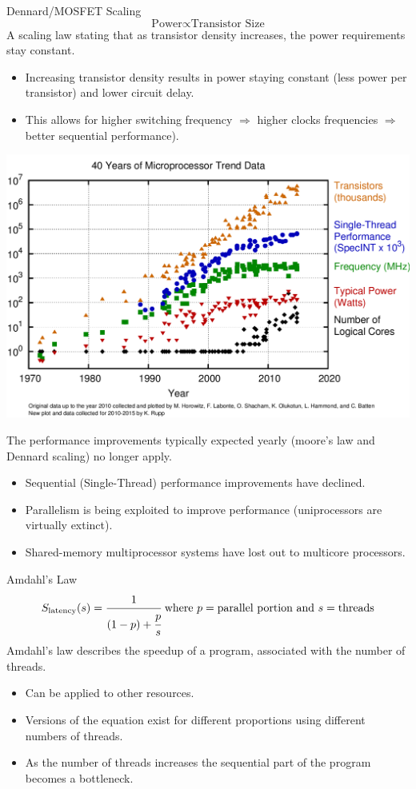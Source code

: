 \begin{definitionbox}{Dennard/MOSFET Scaling}
	\[\text{Power} \propto \text{Transistor Size}\]
	A scaling law stating that as transistor density increases, the power requirements stay constant.
	\begin{itemize}
		\setlength\itemsep{0em}
		\item Increasing transistor density results in power staying constant (less power per transistor) and lower circuit delay.
		\item This allows for higher switching frequency $\Rightarrow$ higher clocks frequencies $\Rightarrow$ better sequential performance).
	\end{itemize}
\end{definitionbox}

\begin{center}
	\includegraphics[width=.9\textwidth]{introduction/images/moores_law_graph.png}
\end{center}
The performance improvements typically expected yearly (moore's law and Dennard scaling) no longer apply.
\begin{itemize}
	\item Sequential (Single-Thread) performance improvements have declined.
	\item Parallelism is being exploited to improve performance (uniprocessors are virtually extinct).
	\item Shared-memory multiprocessor systems have lost out to multicore processors.
\end{itemize}

\begin{definitionbox}{Amdahl's Law}
	\[S_{\text{latency}}(s) = \cfrac{1}{(1-p)+ \cfrac{p}{s}} \text{ where } p = \text{parallel portion} \text{ and } s = \text{threads}\]
	Amdahl's law describes the speedup of a program, associated with the number of threads.
	\begin{itemize}
		\item Can be applied to other resources.
		\item Versions of the equation exist for different proportions using different numbers of threads.
		\item As the number of threads increases the sequential part of the program becomes a bottleneck.
	\end{itemize}
\end{definitionbox}

